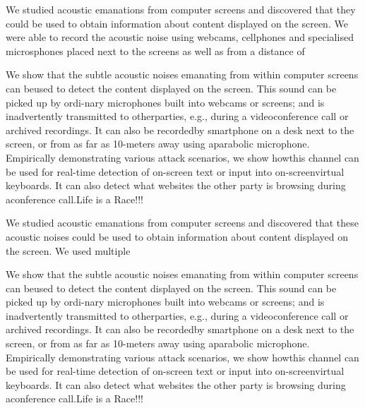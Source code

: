 \documentclass[11pt]{report} %
\begin{document}
\begin{preliminary}
\begin{center}
    \end{center}
    
    \hfill

    \begin{center}
        \begin{minipage}{\textwidth}
            We studied acoustic emanations from computer screens and discovered that they could be used to obtain information about content displayed on the screen. We were able to record the acoustic noise using webcams, cellphones and specialised microsphones placed next to the screens as well as from a distance of 

            We show that the subtle acoustic noises emanating from within computer screens can beused to detect the content displayed on the screen.  This sound can be picked up by ordi-nary microphones built into webcams or screens; and is inadvertently transmitted to otherparties, e.g., during a videoconference call or archived recordings.  It can also be recordedby  smartphone  on  a  desk  next  to  the  screen,  or  from  as  far  as  10-meters  away  using  aparabolic microphone.  Empirically demonstrating various attack scenarios,  we show howthis channel can be used for real-time detection of on-screen text or input into on-screenvirtual keyboards.  It can also detect what websites the other party is browsing during aconference call.Life is a Race!!!

            We studied acoustic emanations from computer screens and discovered that these acoustic noises could be used to obtain information about content displayed on the screen. We used multiple 

            We show that the subtle acoustic noises emanating from within computer screens can beused to detect the content displayed on the screen.  This sound can be picked up by ordi-nary microphones built into webcams or screens; and is inadvertently transmitted to otherparties, e.g., during a videoconference call or archived recordings.  It can also be recordedby  smartphone  on  a  desk  next  to  the  screen,  or  from  as  far  as  10-meters  away  using  aparabolic microphone.  Empirically demonstrating various attack scenarios,  we show howthis channel can be used for real-time detection of on-screen text or input into on-screenvirtual keyboards.  It can also detect what websites the other party is browsing during aconference call.Life is a Race!!!

            

        \end{minipage}
    \end{center}


\end{preliminary}
\end{document}
